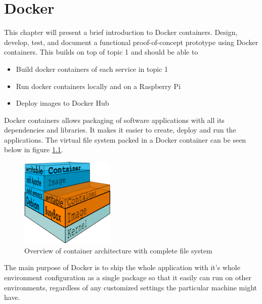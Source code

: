 \chapter{Docker}\label{ch:docker}
This chapter will present a brief introduction to Docker containers.  Design, develop, test, and document a functional proof-of-concept prototype using Docker containers. This builds on top of topic 1 and should be able to

\begin{itemize}
\item Build docker containers of each service in topic 1
\item Run docker containers locally and on a Raspberry Pi
\item Deploy images to Docker Hub
\end{itemize}


Docker containers allows packaging of software applications with all its dependencies and libraries. It makes it easier to create, deploy and run the applications. The virtual file system  packed in a Docker container can be seen below in figure \ref{fig:filesystem}.

\begin{figure}[bth]
  \centering

      \includegraphics[width=0.4\textwidth]{gfx/what_is_layered_filesystems_sm}
  \caption{Overview of container architecture with complete file system }
  \label{fig:filesystem}
  
\end{figure}




The main purpose of Docker is to ship the whole application with it's whole environment configuration as a single package so that it easily can run on other environments, regardless of any customized settings the particular machine might have.


